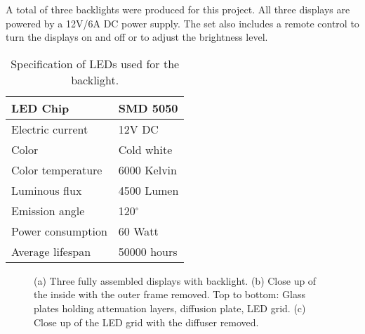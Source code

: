A total of three backlights were produced for this project.
All three displays are powered by a 12V/6A DC power supply.
The set also includes a remote control to turn the displays on and off or to adjust the brightness level.

\begin{table}[htb]
	\centering
	\begin{tabular}{| l | l |}
		\hline
		LED Chip					& SMD 5050 \\
		\hline
		Electric current			& 12V DC \\
		\hline
		Color 						& Cold white \\
		\hline 
		Color temperature 			& 6000 Kelvin \\ 
		\hline  
		Luminous flux 				& 4500 Lumen \\ 
		\hline
		Emission angle				& 120$^\circ$ \\
		\hline 
		Power consumption			& 60 Watt \\
		\hline
		Average lifespan			& 50000 hours \\
		\hline
	\end{tabular} 
	\caption[LED specification]
	{Specification of LEDs used for the backlight.}
	\label{tbl:LED_specs}
\end{table}

\begin{figure}[tb]
	\hfill%
	\hfill%
	\caption[Handcrafted backlights for the attenuation displays]
			{(a) Three fully assembled displays with backlight.
			 (b) Close up of the inside with the outer frame removed.
				 Top to bottom: Glass plates holding attenuation layers, diffusion plate, LED grid.
			 (c) Close up of the LED grid with the diffuser removed.}
\end{figure}
